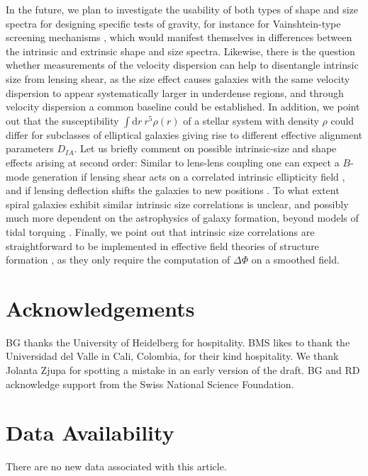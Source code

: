 \documentclass[a4paper,fleqn,usenatbib]{mnras}
\newcommand{\dd}{\mathrm{d}}
\begin{document}
In the future, we plan to investigate the usability of both types of shape and size spectra for designing specific tests of gravity, for instance for Vainshtein-type screening mechanisms \citep{kirk_optimising_2011, tessore_weak_2015}, which would manifest themselves in differences between the intrinsic and extrinsic shape and size spectra. Likewise, there is the question whether measurements of the velocity dispersion can help to disentangle intrinsic size from lensing shear, as the size effect causes galaxies with the same velocity dispersion to appear systematically larger in underdense regions, and through velocity dispersion a common baseline could be established. In addition, we point out that the susceptibility $\int\dd r\:r^5\rho(r)$ of a stellar system with density $\rho$ could differ for subclasses of elliptical galaxies giving rise to different effective alignment parameters $D_{IA}$. Let us briefly comment on possible intrinsic-size and shape effects arising at second order: Similar to lens-lens coupling one can expect a $B$-mode generation if lensing shear acts on a correlated intrinsic ellipticity field \citep[similar to][]{cooray_second-order_2002}, and if lensing deflection shifts the galaxies to new positions \citep{giahi_evolution_2013, giahi-saravani_weak_2014}. To what extent spiral galaxies exhibit similar intrinsic size correlations is unclear, and possibly much more dependent on the astrophysics of galaxy formation, beyond models of tidal torquing \citep{schaefer_review:_2009}.  Finally, we point out that intrinsic size correlations are straightforward to be implemented in effective field theories of structure formation \citep{fang_fast-pt_2017, vlah_eft_2019}, as they only require the computation of $\Delta\Phi$ on a smoothed field.


\section*{Acknowledgements}
BG thanks the University of Heidelberg for hospitality. BMS likes to thank the Universidad del Valle in Cali, Colombia, for their kind hospitality. We thank Jolanta Zjupa for spotting a mistake in an early version of the draft. BG and RD acknowledge support from the Swiss National Science Foundation.

\section*{Data Availability}
There are no new data associated with this article.




\bsp
\label{lastpage}
\end{document}
